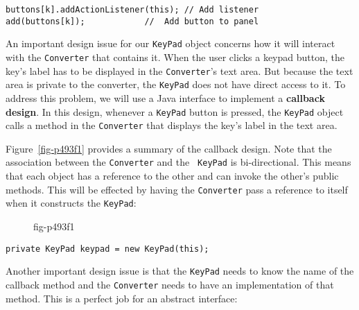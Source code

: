\begin{jjjlisting}
\begin{lstlisting}
buttons[k].addActionListener(this); // Add listener
add(buttons[k]);            //  Add button to panel
\end{lstlisting}
\end{jjjlisting}

\noindent An important design issue for our {\tt KeyPad} object concerns how it will
interact with the {\tt Converter} that contains it.  When the user
clicks a keypad button, the key's label has to be displayed in the
{\tt Converter}'s text area. But because the text area is private to the
converter, the {\tt KeyPad} does not have direct access to it. To
address this problem, we will use a Java interface to implement a 
{\bf callback design}. In this design, whenever a {\tt KeyPad}
button is pressed, the {\tt KeyPad} object calls a method in the
{\tt Converter} that displays the key's label in the text area.


Figure~\ref{fig-p493f1} provides a summary of the callback design.
Note that the association between the {\tt Converter} and the {\tt
KeyPad} is bi-directional. This means that each object has a reference
to the other and can invoke the other's public methods. This will be
effected by having the {\tt Converter} pass a reference to itself when
it constructs the {\tt KeyPad}:

\begin{figure}[b!]
 {fig-p493f1}

\end{figure}

\begin{jjjlisting}
\begin{lstlisting}
private KeyPad keypad = new KeyPad(this);
\end{lstlisting}
\end{jjjlisting}

\noindent Another important design issue is that the {\tt KeyPad} needs 
to know the name of the callback method and the {\tt Converter} needs
to have an implementation of that method. This is a perfect job for an
abstract interface:

